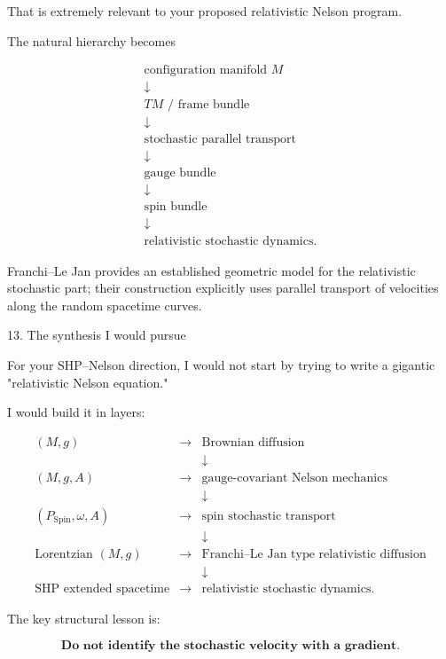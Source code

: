 That is extremely relevant to your proposed relativistic Nelson program.

The natural hierarchy becomes

$$ \boxed{ \begin{array}{c} \text{configuration manifold }M\\ \downarrow\\ TM\text{ / frame bundle}\\ \downarrow\\ \text{stochastic parallel transport}\\ \downarrow\\ \text{gauge bundle}\\ \downarrow\\ \text{spin bundle}\\ \downarrow\\ \text{relativistic stochastic dynamics}. \end{array}} $$

Franchi--Le Jan provides an established geometric model for the relativistic stochastic part; their construction explicitly uses parallel transport of velocities along the random spacetime curves.

13. The synthesis I would pursue

For your SHP–Nelson direction, I would not start by trying to write a gigantic "relativistic Nelson equation."

I would build it in layers:

$$ \boxed{ \begin{array}{rcl} (M,g) &\longrightarrow& \text{Brownian diffusion} \\ &&\downarrow\\ (M,g,A) &\longrightarrow& \text{gauge-covariant Nelson mechanics} \\ &&\downarrow\\ (P_{\mathrm{Spin}},\omega,A) &\longrightarrow& \text{spin stochastic transport} \\ &&\downarrow\\ \text{Lorentzian }(M,g) &\longrightarrow& \text{Franchi--Le Jan type relativistic diffusion} \\ &&\downarrow\\ \text{SHP extended spacetime} &\longrightarrow& \text{relativistic stochastic dynamics}. \end{array}} $$

The key structural lesson is:

$$ \boxed{ \textbf{Do not identify the stochastic velocity with a gradient.} } $$

